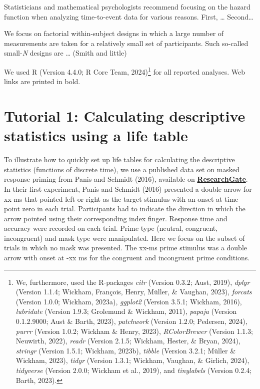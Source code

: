 \documentclass[
  man,floatsintext]{apa6}
\begin{document}
Statisticians and mathematical psychologists recommend focusing on the hazard function when analyzing time-to-event data for various reasons. First, \ldots{}
Second\ldots{}

We focus on factorial within-subject designs in which a large number of measurements are taken for a relatively small set of participants. Such so-called small-\emph{N} designs are \ldots{} (Smith and little)

We used R (Version 4.4.0; R Core Team, 2024)\footnote{We, furthermore, used the R-packages \emph{citr} (Version 0.3.2; Aust, 2019), \emph{dplyr} (Version 1.1.4; Wickham, François, Henry, Müller, \& Vaughan, 2023), \emph{forcats} (Version 1.0.0; Wickham, 2023a), \emph{ggplot2} (Version 3.5.1; Wickham, 2016), \emph{lubridate} (Version 1.9.3; Grolemund \& Wickham, 2011), \emph{papaja} (Version 0.1.2.9000; Aust \& Barth, 2023), \emph{patchwork} (Version 1.2.0; Pedersen, 2024), \emph{purrr} (Version 1.0.2; Wickham \& Henry, 2023), \emph{RColorBrewer} (Version 1.1.3; Neuwirth, 2022), \emph{readr} (Version 2.1.5; Wickham, Hester, \& Bryan, 2024), \emph{stringr} (Version 1.5.1; Wickham, 2023b), \emph{tibble} (Version 3.2.1; Müller \& Wickham, 2023), \emph{tidyr} (Version 1.3.1; Wickham, Vaughan, \& Girlich, 2024), \emph{tidyverse} (Version 2.0.0; Wickham et al., 2019), and \emph{tinylabels} (Version 0.2.4; Barth, 2023).} for all reported analyses. Web links are printed in bold.

\section{Tutorial 1: Calculating descriptive statistics using a life table}\label{tutorial-1-calculating-descriptive-statistics-using-a-life-table}

To illustrate how to quickly set up life tables for calculating the descriptive statistics (functions of discrete time), we use a published data set on masked response priming from Panis and Schmidt (2016), available on \href{https://www.researchgate.net/publication/304069212_What_Is_Shaping_RT_and_Accuracy_Distributions_Active_and_Selective_Response_Inhibition_Causes_the_Negative_Compatibility_Effect}{\textbf{ResearchGate}}.
In their first experiment, Panis and Schmidt (2016) presented a double arrow for xx ms that pointed left or right as the target stimulus with an onset at time point zero in each trial. Participants had to indicate the direction in which the arrow pointed using their corresponding index finger. Response time and accuracy were recorded on each trial. Prime type (neutral, congruent, incongruent) and mask type were manipulated. Here we focus on the subset of trials in which no mask was presented. The xx-ms prime stimulus was a double arrow with onset at -xx ms for the congruent and incongruent prime conditions.
\end{document}
